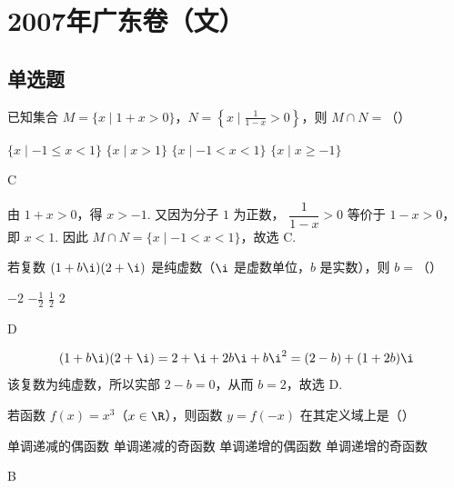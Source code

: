 \chapter{2007年广东卷（文）}

\section{单选题}

\begin{problem}
已知集合 \(M = \{x \mid 1 + x > 0\}\)，\(N = \left\{x \mid \frac{1}{1 - x} > 0\right\}\)，则 \(M \cap N =\)（\quad）

\choices
    {\(\{x\mid -1\leqslant x < 1\}\)}
    {\( \{x \mid x > 1\} \)}
    {\(\{x\mid -1 < x < 1\}\)}
    {\( \{x \mid x \geqslant -1\} \)}
\end{problem}

\begin{answer}
C
\end{answer}

\begin{solution}
由 \(1+x>0\)，得 \(x>-1\). 又因为分子 \(1\) 为正数，
\(\dfrac{1}{1-x}>0\) 等价于 \(1-x>0\)，即 \(x<1\). 因此
\(M\cap N=\{x\mid -1<x<1\}\)，故选 C.
\end{solution}

\begin{problem}
若复数 \((1 + b\i)(2 + \i)\) 是纯虚数（\(\i\) 是虚数单位，\(b\) 是实数），则 \(b =\)（\quad）

\choices
    {\(-2\)}
    {\( -\frac{1}{2} \)}
    {\( \frac{1}{2} \)}
    {\(2\)}
\end{problem}

\begin{answer}
D
\end{answer}

\begin{solution}
\[
(1+b\i)(2+\i)=2+\i+2b\i+b\i^{2}=(2-b)+(1+2b)\i
\]
该复数为纯虚数，所以实部 \(2-b=0\)，从而 \(b=2\)，故选 D.
\end{solution}

\begin{problem}
若函数 \( f(x) = x^3 \)（\(x \in \R\)），则函数 \( y = f(-x) \) 在其定义域上是（\quad）

\choices
    {单调递减的偶函数}
    {单调递减的奇函数}
    {单调递增的偶函数}
    {单调递增的奇函数}
\end{problem}

\begin{answer}
B
\end{answer}

